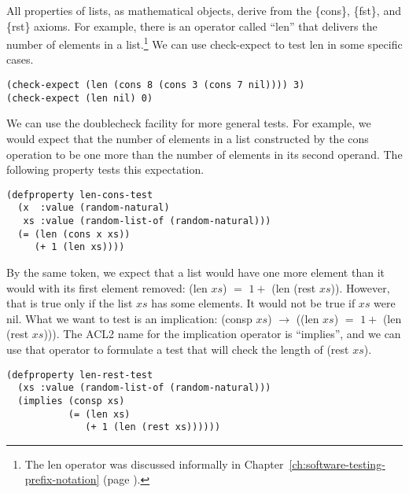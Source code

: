 All properties of lists, as mathematical objects,
derive from the \{cons\}, \{fst\}, and \{rst\} axioms.
For example, there is an operator called ``len''
that delivers the number of elements in a list.\footnote{The
len operator was discussed informally in Chapter~\ref{ch:software-testing-prefix-notation}
(page \pageref{len-op-informal}).}
We can use check-expect to test len in some specific cases.

\begin{Verbatim}
(check-expect (len (cons 8 (cons 3 (cons 7 nil)))) 3)
(check-expect (len nil) 0)
\end{Verbatim}

We can use the doublecheck facility for more general tests.
For example, we would expect that the number of elements
in a list constructed by the cons operation to be
one more than the number of elements in its second operand.
The following property tests this expectation.

\begin{Verbatim}
(defproperty len-cons-test
  (x  :value (random-natural)
   xs :value (random-list-of (random-natural)))
  (= (len (cons x xs))
     (+ 1 (len xs))))
\end{Verbatim}

By the same token, we expect that a list would
have one more element than it would with
its first element removed: (len $xs$) $=$ $1 +$ (len (rest $xs$)).
However, that is true only if the list $xs$
has some elements. It would not be true if $xs$ were nil.
What we want to test is an implication:
(consp $xs$) $\rightarrow$ ((len $xs$) $=$ $1 +$ (len (rest $xs$))).
The ACL2 name for the implication operator is ``implies'',
and we can use that operator to formulate a test that
will check the length of (rest $xs$).

\begin{Verbatim}
(defproperty len-rest-test
  (xs :value (random-list-of (random-natural)))
  (implies (consp xs)
           (= (len xs)
              (+ 1 (len (rest xs))))))
\end{Verbatim}

